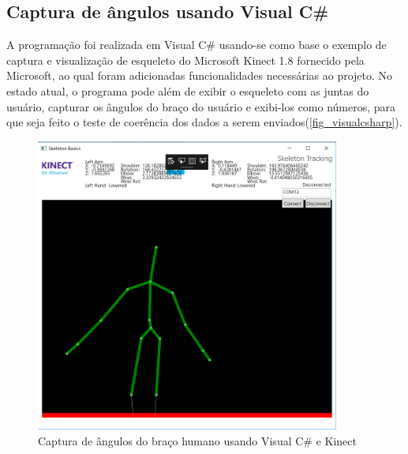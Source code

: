 \subsection{ Captura de ângulos usando Visual C\#}\label{subsec-visualCsharp}
A programação foi realizada em Visual C\# usando-se como base o exemplo de captura e visualização de esqueleto do Microsoft Kinect 1.8 fornecido pela Microsoft, ao qual foram adicionadas funcionalidades necessárias ao projeto. No estado atual, o programa pode além de exibir o esqueleto com as juntas do usuário, capturar os ângulos do braço do usuário e exibi-los como números, para que seja feito o teste de coerência dos dados a serem enviados(\autoref{fig_visualcsharp}).\par
\begin{figure}[h!]
	\caption{\label{fig_visualcsharp}  Captura de ângulos do braço humano usando Visual C\# e Kinect}
	\begin{center}
		\includegraphics[width=100mm]{vbscreen.png}	
	\end{center}
\end{figure}


